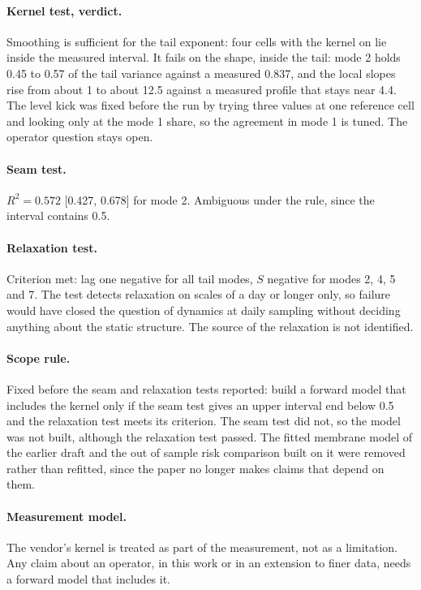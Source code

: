 \documentclass[11pt]{article}
\begin{document}
\paragraph{Kernel test, verdict.} Smoothing is sufficient for the tail exponent: four cells with the kernel on lie inside the measured interval. It fails on the shape, inside the tail: mode 2 holds 0.45 to 0.57 of the tail variance against a measured 0.837, and the local slopes rise from about 1 to about 12.5 against a measured profile that stays near 4.4. The level kick was fixed before the run by trying three values at one reference cell and looking only at the mode 1 share, so the agreement in mode 1 is tuned. The operator question stays open.

\paragraph{Seam test.} $R^2=0.572$ [0.427, 0.678] for mode 2. Ambiguous under the rule, since the interval contains 0.5.

\paragraph{Relaxation test.} Criterion met: lag one negative for all tail modes, $S$ negative for modes 2, 4, 5 and 7. The test detects relaxation on scales of a day or longer only, so failure would have closed the question of dynamics at daily sampling without deciding anything about the static structure. The source of the relaxation is not identified.

\paragraph{Scope rule.} Fixed before the seam and relaxation tests reported: build a forward model that includes the kernel only if the seam test gives an upper interval end below 0.5 and the relaxation test meets its criterion. The seam test did not, so the model was not built, although the relaxation test passed. The fitted membrane model of the earlier draft and the out of sample risk comparison built on it were removed rather than refitted, since the paper no longer makes claims that depend on them.

\paragraph{Measurement model.} The vendor's kernel is treated as part of the measurement, not as a limitation. Any claim about an operator, in this work or in an extension to finer data, needs a forward model that includes it.
\end{document}
